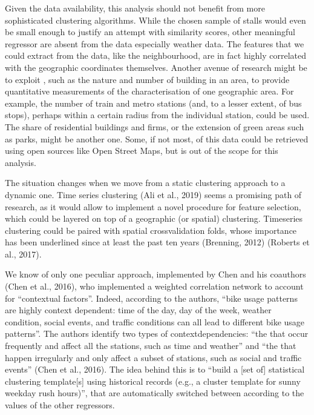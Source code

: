 \documentclass[letterpaper,10pt,english]{jupyterBook}
\begin{document}
\sphinxAtStartPar
Given the data availability, this analysis should not benefit from more sophisticated clustering algorithms. While the chosen sample of stalls would even be small enough to justify an attempt with similarity scores, other meaningful regressor are absent from the data \sphinxhyphen{} especially weather data. The features that we could extract from the data, like the neighbourhood, are in fact highly correlated with the geographic coordinates themselves. Another avenue of research might be to exploit , such as the nature and number of building in an area, to provide quantitative measurements of the characterisation of one geographic area. For example, the number of train and metro stations (and, to a lesser extent, of bus stops), perhaps within a certain radius from the individual station, could be used. The share of residential buildings and firms, or the extension of green areas such as parks, might be another one. Some, if not most, of this data could be retrieved using open sources like Open Street Maps, but is out of the scope for this analysis.

\sphinxAtStartPar
The situation changes when we move from a static clustering approach to a dynamic one. Time series clustering (Ali et al., 2019) seems a promising path of research, as it would allow to implement a novel procedure for feature selection, which could be layered on top of a geographic (or spatial) clustering. Time\sphinxhyphen{}series clustering could be paired with spatial cross\sphinxhyphen{}validation folds, whose importance has been underlined since at least the past ten years (Brenning, 2012) (Roberts et al., 2017).

\sphinxAtStartPar
We know of only one peculiar approach, implemented by Chen and his coauthors (Chen et al., 2016), who implemented a weighted correlation network to account for “contextual factors”. Indeed, according to the authors, “bike usage patterns are highly context dependent: time of the day, day of the week, weather condition, social events, and traffic conditions can all lead to different bike usage patterns”. The authors identify two types of context\sphinxhyphen{}dependencies: “the  that occur frequently and affect all the stations, such as time and weather” and “the  that happen irregularly and only affect a subset of stations, such as social and traffic events” (Chen et al., 2016). The idea behind this is to “build a {[}set of{]} statistical clustering template{[}s{]} using historical records (e.g., a cluster template for sunny weekday rush hours)”, that are automatically switched between according to the values of the other regressors.
\end{document}
